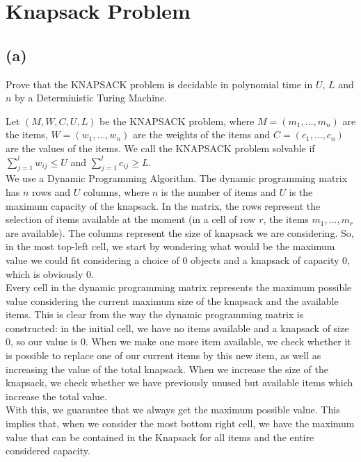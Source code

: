 

\setcounter{section}{1}


\section{Knapsack Problem}

\subsection{(a)}

Prove that the \textsc{KNAPSACK} problem is decidable in polynomial time in $U$, $L$ and $n$ by a Deterministic Turing Machine.

Let $(M,W,C,U,L)$ be the \textsc{KNAPSACK} problem, where $M = (m_{1},\ldots,m_{n})$ are the items, $W = (w_{1},\ldots,w_{n})$ are the weights of the items and $C=(c_{1},\ldots,c_{n})$ are the values of the items. We call the \textsc{KNAPSACK} problem solvable if $\sum_{j=1}^{l}w_{ij} \leq U$ and $\sum_{j=1}^{l}c_{ij}\geq L$.\\
We use a Dynamic Programming Algorithm. The dynamic programming matrix has $n$ rows and $U$ columns, where $n$ is the number of items and $U$ is the maximum capacity of the knapsack. In the matrix, the rows represent the selection of items available at the moment (in a cell of row $r$, the items $m_{1},\ldots,m_{r}$ are available). The columns represent the size of knapsack we are considering. So, in the most top-left cell, we start by wondering what would be the maximum value we could fit considering a choice of $0$ objects and a knapsack of capacity $0$, which is obviously $0$.\\
Every cell in the dynamic programming matrix represents the maximum possible value considering the current maximum size of the knapsack and the available items. This is clear from the way the dynamic programming matrix is constructed: in the initial cell, we have no items available and a knapsack of size $0$, so our value is $0$. When we make one more item available, we check whether it is possible to replace one of our current items by this new item, as well as increasing the value of the total knapsack. When we increase the size of the knapsack, we check whether we have previously unused but available items which increase the total value.\\
With this, we guarantee that we always get the maximum possible value. This implies that, when we consider the most bottom right cell, we have the maximum value that can be contained in the Knapsack for all items and the entire considered capacity.\\

